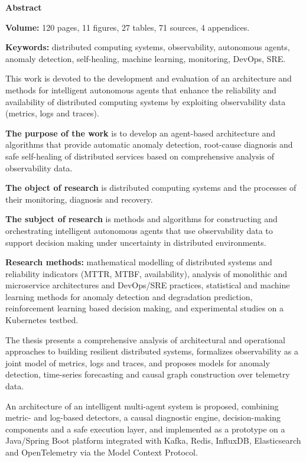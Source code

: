 \textbf{Abstract}

\textbf{Volume:} 120 pages, 11 figures, 27 tables, 71 sources, 4 appendices.

\textbf{Keywords:} distributed computing systems, observability, autonomous agents, anomaly detection, self-healing, machine learning, monitoring, DevOps, SRE.

\vspace{1cm}

This work is devoted to the development and evaluation of an architecture and methods for intelligent autonomous agents that enhance the reliability and availability of distributed computing systems by exploiting observability data (metrics, logs and traces).

\textbf{The purpose of the work} is to develop an agent-based architecture and algorithms that provide automatic anomaly detection, root-cause diagnosis and safe self-healing of distributed services based on comprehensive analysis of observability data.

\textbf{The object of research} is distributed computing systems and the processes of their monitoring, diagnosis and recovery.

\textbf{The subject of research} is methods and algorithms for constructing and orchestrating intelligent autonomous agents that use observability data to support decision making under uncertainty in distributed environments.

\textbf{Research methods:} mathematical modelling of distributed systems and reliability indicators (MTTR, MTBF, availability), analysis of monolithic and microservice architectures and DevOps/SRE practices, statistical and machine learning methods for anomaly detection and degradation prediction, reinforcement learning based decision making, and experimental studies on a Kubernetes testbed.

The thesis presents a comprehensive analysis of architectural and operational approaches to building resilient distributed systems, formalizes observability as a joint model of metrics, logs and traces, and proposes models for anomaly detection, time-series forecasting and causal graph construction over telemetry data.

An architecture of an intelligent multi-agent system is proposed, combining metric- and log-based detectors, a causal diagnostic engine, decision-making components and a safe execution layer, and implemented as a prototype on a Java/Spring Boot platform integrated with Kafka, Redis, InfluxDB, Elasticsearch and OpenTelemetry via the Model Context Protocol.

